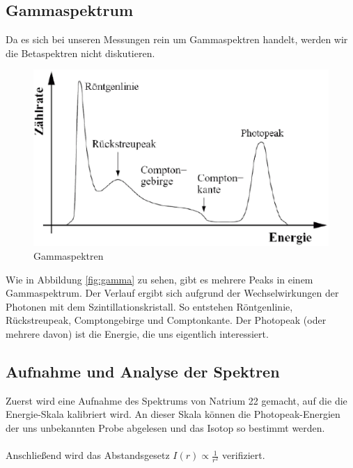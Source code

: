\documentclass{article}
\begin{document}
\subsection{Gammaspektrum}
Da es sich bei unseren Messungen rein um Gammaspektren handelt, werden wir die Betaspektren nicht diskutieren. 
\begin{center}
\begin{figure}[H]
\includegraphics[scale=0.4]{gammaspektren.eps}
\caption{Gammaspektren}
\end{figure}
\label{fig:gamma}
\end{center}
Wie in Abbildung \ref{fig:gamma} zu sehen, gibt es mehrere Peaks in einem Gammaspektrum. Der Verlauf ergibt sich aufgrund der Wechselwirkungen der Photonen mit dem Szintillationskristall. So entstehen Röntgenlinie, Rückstreupeak, Comptongebirge und Comptonkante. Der Photopeak (oder mehrere davon) ist die Energie, die uns eigentlich interessiert. 

\subsection{Aufnahme und Analyse der Spektren}
Zuerst wird eine Aufnahme des Spektrums von Natrium 22 gemacht, auf die die Energie-Skala kalibriert wird. An dieser Skala können die Photopeak-Energien der uns unbekannten Probe abgelesen und das Isotop so bestimmt werden.\\
\\
Anschließend wird das Abstandsgesetz $I(r)\propto\frac{1}{r^2}$ verifiziert.
\end{document}
